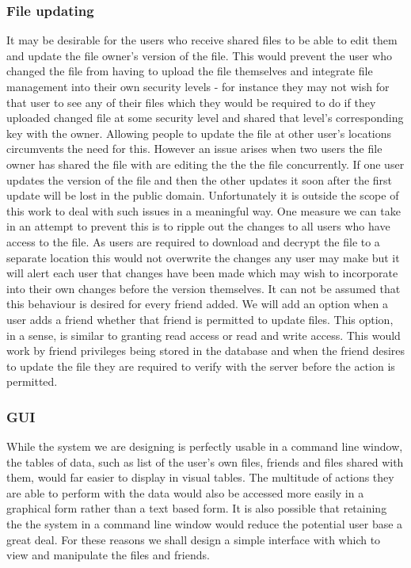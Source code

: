 \documentclass[12pt, titlepage]{article}
\begin{document}
\subsubsection{File updating}
It may be desirable for the users who receive shared files to be able to edit them and update the file owner's version of the file. This would prevent the user who changed the file from having to upload the file themselves and integrate file management into their own security levels - for instance they may not wish for that user to see any of their files which they would be required to do if they uploaded changed file at some security level and shared that level's corresponding key with the owner. Allowing people to update the file at other user's locations circumvents the need for this.
\newline \indent However an issue arises when two users the file owner has shared the file with are editing the the the file concurrently. If one user updates the version of the file and then the other updates it soon after the first update will be lost in the public domain. Unfortunately it is outside the scope of this work to deal with such issues in a meaningful way. One measure we can take in an attempt to prevent this is to ripple out the changes to all users who have access to the file. As users are required to download and decrypt the file to a separate location this would not overwrite the changes any user may make but it will alert each user that changes have been made which may wish to incorporate into their own changes before the version themselves.
\newline \indent It can not be assumed that this behaviour is desired for every friend added. We will add an option when a user adds a friend whether that friend is permitted to update files. This option, in a sense, is similar to granting read access or read and write access. This would work by friend privileges being stored in the database and when the friend desires to update the file they are required to verify with the server before the action is permitted.

\subsubsection{GUI}
While the system we are designing is perfectly usable in a command line window, the tables of data, such as list of the user's own files, friends and files shared with them, would far easier to display in visual tables. The multitude of actions they are able to perform with the data would also be accessed more easily in a graphical form rather than a text based form. It is also possible that retaining the the system in a command line window would reduce the potential user base a great deal. For these reasons we shall design a simple interface with which to view and manipulate the files and friends.
\end{document}

